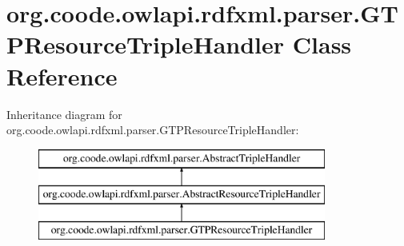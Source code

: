 \hypertarget{classorg_1_1coode_1_1owlapi_1_1rdfxml_1_1parser_1_1_g_t_p_resource_triple_handler}{\section{org.\-coode.\-owlapi.\-rdfxml.\-parser.\-G\-T\-P\-Resource\-Triple\-Handler Class Reference}
\label{classorg_1_1coode_1_1owlapi_1_1rdfxml_1_1parser_1_1_g_t_p_resource_triple_handler}
}
Inheritance diagram for org.\-coode.\-owlapi.\-rdfxml.\-parser.\-G\-T\-P\-Resource\-Triple\-Handler\-:\begin{figure}[H]
\begin{center}
\leavevmode
\includegraphics[height=3.000000cm]{classorg_1_1coode_1_1owlapi_1_1rdfxml_1_1parser_1_1_g_t_p_resource_triple_handler}
\end{center}
\end{figure}
